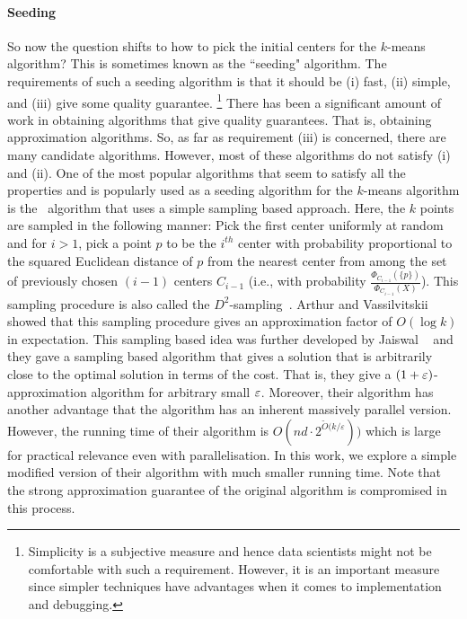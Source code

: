 \noindent

\paragraph{Seeding} So now the question shifts to how to pick the initial centers for the $k$-means algorithm? 
This is sometimes known as the ``seeding" algorithm.
The requirements of such a seeding algorithm is that it should be (i) fast, (ii) simple, and (iii) give some quality guarantee.
\footnote{Simplicity is a subjective measure and hence data scientists might not be comfortable with such a requirement.
However, it is an important measure since simpler techniques have advantages when it comes to implementation and debugging.}
There has been a significant amount of work in obtaining algorithms that give quality guarantees. 
That is, obtaining approximation algorithms. 
So, as far as requirement (iii) is concerned, there are many candidate algorithms. 
However, most of these algorithms do not satisfy (i) and (ii).
One of the most popular algorithms that seem to satisfy all the properties and is popularly used as a seeding algorithm for the $k$-means algorithm is the \kmpp\ algorithm \cite{av07} that uses a simple sampling based approach. 
Here, the $k$ points are sampled in the following manner: Pick the first center uniformly at random and for $i > 1$, pick a point $p$ to be the $i^{th}$ center with probability proportional to the squared Euclidean distance of $p$ from the nearest center from among the set of previously chosen $(i-1)$ centers $C_{i-1}$ (i.e., with probability $\frac{\Phi_{C_{i-1}}(\{p\})}{\Phi_{C_{i-1}}(X)}$). 
This sampling procedure is also called the $D^2$-sampling~\cite{jks}.
Arthur and Vassilvitskii~\cite{av07} showed that this sampling procedure gives an approximation factor of $O(\log{k})$ in expectation.
This sampling based idea was further developed by Jaiswal \etal~\cite{jks} and they gave a sampling based algorithm that gives a solution that is arbitrarily close to the optimal solution in terms of the cost.
That is, they give a $(1 + \varepsilon)$-approximation algorithm for arbitrary small $\varepsilon$.
Moreover, their algorithm has another advantage that the algorithm has an inherent massively parallel version.
However, the running time of their algorithm is $O(nd \cdot 2^{\tilde{O}(k/\varepsilon}))$ which is large for practical relevance even with parallelisation. 
In this work, we explore a simple modified version of their algorithm with much smaller 
running time. 
Note that the strong approximation guarantee of the original algorithm is compromised in this process. 

